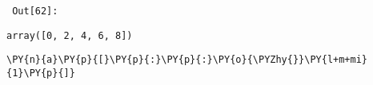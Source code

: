         {\par%
        \vspace{-1\smallerfontscale}%
        \noindent%
        \begin{minipage}{\cellleftmargin}%
    \hfill%
    {\smaller%
    \tt%
    \color{nbframe-out-prompt}%
    Out[62]:}%
    \hspace{\inputpadding}%
    \hspace{0em}%
    \hspace{3pt}%
    \end{minipage}%
        }%
    \begin{addmargin}[\cellleftmargin]{0em}%
    {\smaller%
    \vspace{-1\smallerfontscale}%
    
    
    
    \begin{verbatim}
array([0, 2, 4, 6, 8])
    \end{verbatim}

    
}%
    \end{addmargin}%

{\par%
\vspace{-1\baselineskip}%
}%
\begin{notebookcell}[63]%
\begin{addmargin}[\cellleftmargin]{0em}%
{\smaller%
\par%
%
\vspace{-1\smallerfontscale}%
\begin{Verbatim}[commandchars=\\\{\}]
\PY{n}{a}\PY{p}{[}\PY{p}{:}\PY{p}{:}\PY{o}{\PYZhy{}}\PY{l+m+mi}{1}\PY{p}{]}
\end{Verbatim}
%
\par%
\vspace{-1\smallerfontscale}}%
\end{addmargin}
\end{notebookcell}

\par\vspace{1\smallerfontscale}%
    
